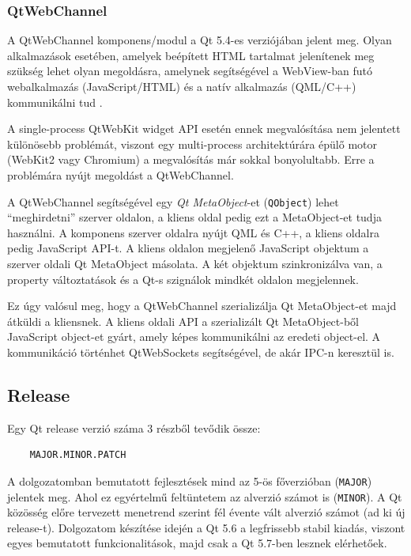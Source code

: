 \documentclass[12pt]{report}
\begin{document}
\subsubsection{QtWebChannel}
A QtWebChannel komponens/modul \cite{bib:qt-doc-qt-webchannel} a Qt 5.4-es verziójában jelent
meg. Olyan alkalmazások esetében, amelyek beépített HTML tartalmat jelenítenek meg szükség
lehet olyan megoldásra, amelynek segítségével a WebView-ban futó webalkalmazás
(JavaScript/HTML) és a natív alkalmazás (QML/C++) kommunikálni tud
\cite{bib:kdab-qt-webchannel}.

A single-process QtWebKit widget API esetén ennek megvalósítása nem jelentett különösebb
problémát, viszont egy multi-process architektúrára épülő motor (WebKit2 vagy Chromium)
a megvalósítás már sokkal bonyolultabb. Erre a problémára nyújt megoldást a QtWebChannel.

A QtWebChannel segítségével egy \textit{Qt MetaObject}-et (\texttt{QObject}) lehet
``meghirdetni'' szerver oldalon, a kliens oldal pedig ezt a MetaObject-et tudja használni.
A komponens szerver oldalra nyújt QML és C++, a kliens oldalra pedig JavaScript API-t.
A kliens oldalon megjelenő JavaScript objektum a szerver oldali Qt MetaObject másolata. A két
objektum szinkronizálva van, a property változtatások és a Qt-s szignálok mindkét oldalon
megjelennek.

Ez úgy valósul meg, hogy a QtWebChannel szerializálja Qt MetaObject-et majd átküldi
a kliensnek. A kliens oldali API a szerializált Qt MetaObject-ből JavaScript
object-et gyárt, amely képes kommunikálni az eredeti object-el. A kommunikáció történhet
QtWebSockets segítségével, de akár IPC-n keresztül is.

\subsection{Release}
Egy Qt release verzió száma 3 részből tevődik össze:
\begin{verbatim}
    MAJOR.MINOR.PATCH
\end{verbatim}
A dolgozatomban bemutatott fejlesztések mind az 5-ös főverzióban (\texttt{MAJOR})
jelentek meg. Ahol ez egyértelmű feltüntetem az alverzió számot is (\texttt{MINOR}).
A Qt közösség előre tervezett menetrend szerint fél évente vált alverzió számot (ad ki új
release-t). Dolgozatom készítése idején a Qt 5.6 a legfrissebb stabil kiadás, viszont egyes
bemutatott funkcionalitások, majd csak a Qt 5.7-ben lesznek elérhetőek.
\end{document}
